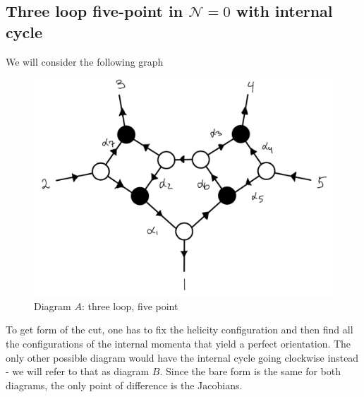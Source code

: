 \documentclass[letter,11pt]{article}
\begin{document}
\subsection{Three loop five-point in $\mathcal{N}=0$ with internal cycle}
We will consider the following graph
\begin{figure}[H]
	\centering
	\includegraphics[width=0.5\linewidth]{5pt3l_2}
	\caption{Diagram $A$: three loop, five point}
	\label{fig:5pt3l_3}
\end{figure}
To get form of the cut, one has to fix the helicity configuration and then find all the configurations of the internal momenta that yield a perfect orientation. The only other possible diagram would have the internal cycle going clockwise instead - we will refer to that as diagram $B$. Since the bare form is the same for both diagrams, the only point of difference is the Jacobians. 
\end{document}
